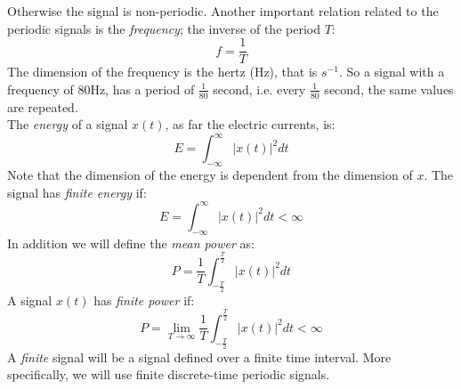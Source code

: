 Otherwise the signal is non-periodic. Another important relation related to the periodic signals is the \textit{frequency}; the inverse of the period $T$:
\[ f=\frac{1}{T} \]
The dimension of the frequency is the hertz (Hz), that is $s^{-1}$. So a signal with a frequency of $80$Hz, has a period of $\frac{1}{80}$ second, i.e. every $\frac{1}{80}$ second, the same values are repeated.\\
The \textit{energy} of a signal $x(t)$, as far the electric currents, is:
\begin{equation}
E=\int_{-\infty}^{\infty} |x(t)|^2 dt
\end{equation}
Note that the dimension of the energy is dependent from the dimension of $x$. The signal has \textit{finite energy} if:
\[ E=\int_{-\infty}^{\infty} |x(t)|^2 dt < \infty \]
In addition we will define the \textit{mean power} as:
\begin{equation}
P = \frac{1}{T} \int_{-\frac{T}{2}}^{\frac{T}{2}} |x(t)|^2 dt
\end{equation}
A signal $x(t)$ has \textit{finite power} if:
\[ P = \lim_{T\to \infty} \frac{1}{T} \int_{-\frac{T}{2}}^{\frac{T}{2}} |x(t)|^2 dt < \infty \]
A \textit{finite} signal will be a signal defined over a finite time interval. More specifically, we will use finite discrete-time periodic signals.
